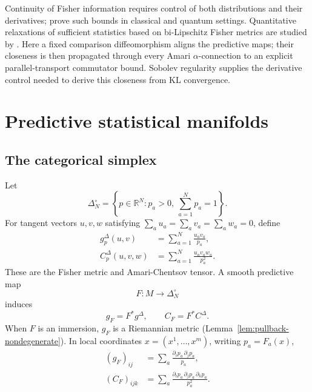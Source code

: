 \documentclass[11pt]{article}
\theoremstyle{definition}
\theoremstyle{remark}
\newcommand{\simplex}{\Delta_{N}^{\circ}}
\newcommand{\R}{\mathbb{R}}
\begin{document}
Continuity of Fisher information requires control of both distributions and their derivatives; \citet{rezakhaniHassaniAlipour2019} prove such bounds in classical and quantum settings. Quantitative relaxations of sufficient statistics based on bi-Lipschitz Fisher metrics are studied by \citet{yamaguchiNozawa2024}. Here a fixed comparison diffeomorphism aligns the predictive maps; their closeness is then propagated through every Amari $\alpha$-connection to an explicit parallel-transport commutator bound. Sobolev regularity supplies the derivative control needed to derive this closeness from KL convergence.

\section{Predictive statistical manifolds}

\subsection{The categorical simplex}

Let
\begin{equation}
    \simplex=\left\{p\in\R^N:p_a>0,\ \sum_{a=1}^N p_a=1\right\}.
\end{equation}
For tangent vectors $u,v,w$ satisfying $\sum_a u_a=\sum_a v_a=\sum_a w_a=0$, define
\begin{align}
    g_p^{\Delta}(u,v)&=\sum_{a=1}^N\frac{u_av_a}{p_a},\label{eq:simplex-fisher}\\
    C_p^{\Delta}(u,v,w)&=\sum_{a=1}^N\frac{u_av_aw_a}{p_a^2}.\label{eq:simplex-cubic}
\end{align}
These are the Fisher metric and Amari-Chentsov tensor. A smooth predictive map
\begin{equation}
    F:M\longrightarrow\simplex
\end{equation}
induces
\begin{equation}
    g_F=F^*g^{\Delta},\qquad C_F=F^*C^{\Delta}.
\end{equation}
When $F$ is an immersion, $g_F$ is a Riemannian metric (Lemma~\ref{lem:pullback-nondegenerate}). In local coordinates $x=(x^1,\ldots,x^m)$, writing $p_a=F_a(x)$,
\begin{align}
    (g_F)_{ij}&=\sum_a\frac{\partial_i p_a\,\partial_j p_a}{p_a},\label{eq:pullback-metric}\\
    (C_F)_{ijk}&=\sum_a\frac{\partial_i p_a\,\partial_j p_a\,\partial_k p_a}{p_a^2}.\label{eq:pullback-cubic}
\end{align}
\end{document}

